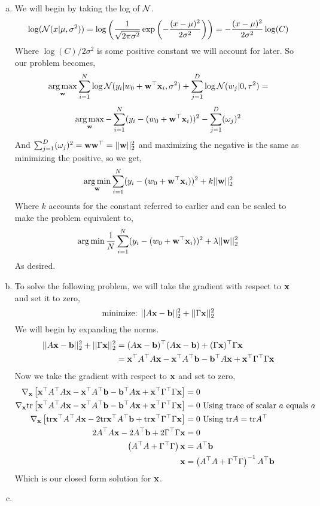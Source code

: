 \documentclass[12pt,letterpaper,fleqn]{hmcpset}
\begin{document}
\vspace{15mm}

\begin{enumerate}[(a)]
    \item 
        We will begin by taking the log of ${\cal N}$.
            $$\log({\cal N}(x|\mu,\sigma^2)) = \log\left(\frac{1}{\sqrt{2\pi\sigma^2}}\exp\left(-\frac{(x-\mu)^2}{2\sigma^2}\right)\right)=-\frac{(x-\mu)^2}{2\sigma^2}\log(C)$$
            Where $\log(C)/2\sigma^2$ is some positive constant we will account for later. So our problem becomes,
                $$\operatorname*{arg\,max}_{\bf w} \sum_{i=1}^N \log{\cal N}(y_i | w_0 + {\bf w}^\top{\bf x}_i, \sigma^2) + \sum_{j=1}^D \log{\cal N}(w_j | 0, \tau^2) =$$
                $$  \operatorname*{arg\,max}_{\bf w} -\sum_{i=1}^N (y_i-(w_0 + {\bf w}^\top{\bf x}_i))^2 - \sum_{j=1}^D (\omega_j)^2$$
            And $\sum_{j=1}^D (\omega_j)^2 = {\bf w} {\bf w}^\top = ||{\bf w}||_2^2$ and maximizing the negative is the same as minimizing the positive, so we get,
                $$  \operatorname*{arg\,min}_{\bf w} \sum_{i=1}^N (y_i-(w_0 + {\bf w}^\top{\bf x}_i))^2 + k ||{\bf w}||_2^2$$
            Where $k$ accounts for the constant referred to earlier and can be scaled to make the problem equivalent to,
                \[
                \operatorname*{arg\,min} \frac{1}{N}\sum_{i=1}^N (y_i - (w_0 + {\bf w}^\top{\bf x}_i))^2 + \lambda ||{\bf w}||_2^2
                \]
            As desired.
    \item
        To solve the following problem, we will take the gradient with respect to ${\bf x}$ and set it to zero,
            $$\text{minimize: } ||A{\bf x} - {\bf b}||_2^2 + ||\Gamma{\bf x}||_2^2$$
        We will begin by expanding the norms.
            \begin{align*}
                ||A{\bf x} - {\bf b}||_2^2 + ||\Gamma{\bf x}||_2^2 &= (A{\bf x} - {\bf b})^\top(A{\bf x} - {\bf b}) + (\Gamma {\bf x})^\top \Gamma {\bf x} \\
                &= {\bf x}^\top A^\top A {\bf x} - {\bf x}^\top A^\top {\bf b} - {\bf b}^\top A {\bf x} + {\bf x}^\top \Gamma^\top \Gamma {\bf x} \\ 
            \end{align*}
        Now we take the gradient with respect to ${\bf x}$ and set to zero,
            \begin{align*}
                \nabla_{\bf x} \left[ {\bf x}^\top A^\top A {\bf x} - {\bf x}^\top A^\top {\bf b} - {\bf b}^\top A {\bf x} + {\bf x}^\top \Gamma^\top \Gamma {\bf x}  \right]&= 0\\
                 \nabla_{\bf x} {\hbox{tr}} \left[ {\bf x}^\top A^\top A {\bf x} - {\bf x}^\top A^\top {\bf b} - {\bf b}^\top A {\bf x} + {\bf x}^\top \Gamma^\top \Gamma {\bf x}  \right] &= 0 \text{   Using trace of scalar $a$ equals $a$} \\
                 \nabla_{\bf x} \left[ {\hbox{tr}} {\bf x}^\top A^\top A {\bf x} - 2{\hbox{tr}} {\bf x}^\top A^\top {\bf b} + {\hbox{tr}} {\bf x}^\top \Gamma^\top \Gamma {\bf x}  \right] &= 0 \text{   Using ${\hbox{tr}} A = {\hbox{tr}} A^\top$}\\
                 2A^\top A {\bf x} -2A^\top {\bf b} + 2\Gamma^\top \Gamma {\bf x} &= 0\\
                 \left( A^\top A + \Gamma^\top \Gamma \right) {\bf x} &= A^\top{\bf b} \\
                 {\bf x} &= \left( A^\top A + \Gamma^\top \Gamma \right)^{-1} A^\top {\bf b}
            \end{align*}
        Which is our closed form solution for ${\bf x}$.
    \item


\end{enumerate}
\end{document}
